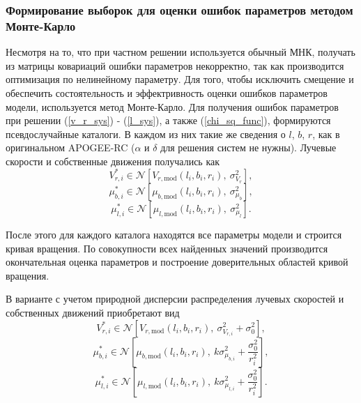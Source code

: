 \documentclass{matmex-diploma-custom}
\begin{document}
\subsubsection{Формирование выборок для оценки ошибок параметров методом \\ Монте-Карло} \label{mk}
Несмотря на то, что при частном решении используется обычный МНК, получать из матрицы ковариаций ошибки параметров некорректно, так как производится оптимизация по нелинейному параметру. Для того, чтобы исключить смещение и обеспечить состоятельность и эффектривность оценки ошибков параметров модели, используется метод Монте-Карло. Для получения ошибок параметров при решении (\ref{v_r_sys}) - (\ref{l_sys}), а также (\ref{chi_sq_func}), формируются псевдослучайные каталоги. В каждом из них такие же сведения о $l$, $b$, $r$, как в оригинальном APOGEE-RC ($\alpha$ и $\delta$ для решения систем не нужны). Лучевые скорости и собственные движения получались как
\begin{equation}
        V_{r, i}^{*} \in \mathcal{N} \left[ V_{r, \mathrm{mod}}(l_i, b_i, r_i), ~\sigma^2_{V_r} \right],
\end{equation}
\begin{equation}
        \mu_{b, i}^{*} \in \mathcal{N} \left[ \mu_{b, \mathrm{mod}}(l_i, b_i, r_i), ~\sigma^2_{\mu_b} \right],
\end{equation}
\begin{equation}
        \mu_{l, i}^{*} \in \mathcal{N} \left[ \mu_{l, \mathrm{mod}}(l_i, b_i, r_i), ~\sigma^2_{\mu_l} \right].
\end{equation}
\par После этого для каждого каталога находятся все параметры модели и строится кривая вращения. По совокупности всех найденных значений производится окончательная оценка параметров и построение доверительных областей кривой вращения.

\pagebreak
\par В варианте с учетом природной дисперсии распределения лучевых скоростей и собственных движений приобретают вид
\begin{equation}
        V_{r, i}^{*} \in \mathcal{N} \left[ V_{r, \mathrm{mod}}(l_i, b_i, r_i),  ~\sigma^2_{V_{r, i}} + \sigma^2_0\right],
\end{equation}
\begin{equation}
        \mu_{b, i}^{*} \in \mathcal{N} \left[ \mu_{b, \mathrm{mod}}(l_i, b_i, r_i),  ~k \sigma^2_{\mu_{b, i}} + \frac{\sigma_0^2}{r^2_i} \right],
\end{equation}
\begin{equation}
        \mu_{l, i}^{*} \in \mathcal{N} \left[ \mu_{l, \mathrm{mod}}(l_i, b_i, r_i), ~k \sigma^2_{\mu_{l, i}} + \frac{\sigma_0^2}{r^2_i} \right].
\end{equation}
\end{document}
